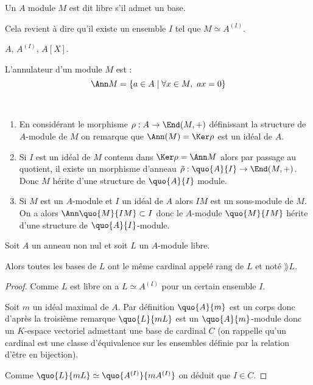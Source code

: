 \begin{defi}
 
Un $A$ module $M$ est dit libre s'il admet un base.

Cela revient à dire qu'il
existe un ensemble $I$ tel que $M\simeq A^{(I)}$.
\end{defi}

\begin{example}[Exemples]
 $A$, $A^{(I)}$, $A[X]$.
\end{example}

\vspace{0.5em}
\begin{defi}

L'annulateur d'un module $M$ est :
\begin{displaymath}
 \Ann M = \{a\in A \mid \forall x\in M,\ ax = 0\}
\end{displaymath}
\end{defi}

\begin{example}[Remarques]\

\begin{enumerate}
 \item En considérant le morphisme $\rho : A \rightarrow \End(M,+)$ définissant
la structure de $A$-module de $M$ on remarque que $\Ann(M) = \Ker\rho$ est un
idéal de $A$.
\item Si $I$ est un idéal de $M$ contenu dans $\Ker\rho = \Ann M$ alors par
passage au quotient, il existe un morphisme d'anneau $\tilde{\rho} :
\quo{A}{I} \rightarrow \End(M,+)$. Donc $M$ hérite d'une structure de
$\quo{A}{I}$ module.
\item Si $M$ est un $A$-module et $I$ un idéal de $A$ alors $IM$ est un
sous-module de $M$. On a alors $\Ann \quo{M}{IM} \subset I$ donc le $A$-module
$\quo{M}{IM}$ hérite d'une structure de $\quo{A}{I}$-module.
\end{enumerate}
\end{example}

\begin{defiprop}

Soit $A$ un anneau non nul et soit $L$ un $A$-module libre.

Alors toutes les
bases de $L$ ont le même cardinal appelé rang de $L$ et noté $\rang L$.
\end{defiprop}

\begin{proof} Comme $L$ est libre on a $L\simeq A^{(I)}$ pour un certain
ensemble $I$.

Soit $m$ un idéal maximal de $A$. Par définition $\quo{A}{m}$ est un corps donc
d'après la troisième remarque $\quo{L}{mL}$ est un $\quo{A}{m}$-module donc un
$K$-espace vectoriel admettant une base de cardinal $C$ (on rappelle qu'un
cardinal est une classe d'équivalence sur les ensembles définie par la relation
d'être en bijection).

Comme $\quo{L}{mL} \simeq 
\quo{A^{(I)}}{mA^{(I)}} $ on déduit que $I\in C$.
\end{proof}

